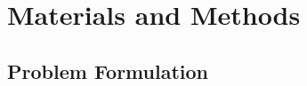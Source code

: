 \documentclass[review,number,sort&compress]{elsarticle}
\begin{document}
%
%

\providecommand{\R}{\mathbb{R}}
\providecommand{\E}{\mathbb{E}}
\providecommand{\Prob}{\mathbb{P}}
\providecommand{\Ind}{\mathbb{I}}
\providecommand{\Fcal}{\mathcal{F}}
\providecommand{\Dtrain}{\mathcal{D}_{\mathrm{tr}}}
\providecommand{\Dcal}{\mathcal{D}_{\mathrm{cal}}}
\providecommand{\Dtest}{\mathcal{D}_{\mathrm{te}}}
\providecommand{\Scal}{\mathcal{S}}
\providecommand{\Gcal}{\mathcal{G}}
\providecommand{\eps}{\varepsilon}
\providecommand{\ybase}{\widehat{y}^{\,\mathrm{base}}}
\providecommand{\rhat}{\widehat{r}}
\providecommand{\yhat}{\widehat{y}}
\providecommand{\MAPEe}{\mathrm{MAPE}_{\eps}}
\providecommand{\MSIS}{\mathrm{MSIS}}
\providecommand{\ECP}{\mathrm{ECP}}


\section{Materials and Methods}
\label{sec:methods}

\subsection{Problem Formulation}
\label{subsec:problem_formulation}
\end{document}
